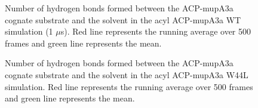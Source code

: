 \begin{singlespacing}
		\setlength\fboxsep{5pt}
		\setlength\fboxrule{1.5pt}
		\begin{figure}[htbp]
		\centering
		\caption[Number of hydrogen bonds formed between the ACP-mupA3a cognate substrate and the solvent in the acyl ACP-mupA3a WT simulation (1 $ \mu $s).]{Number of hydrogen bonds formed between the ACP-mupA3a cognate substrate and the solvent in the acyl ACP-mupA3a WT simulation (1 $ \mu $s).  Red line represents the running average over 500 frames and green line represents the mean.}
		\label{fig:HbondACPSPMWild1000_solvent}
		\end{figure}			
		
		\setlength\fboxsep{5pt}
		\setlength\fboxrule{1.5pt}
		\begin{figure}[htbp]
		\centering
		\caption[Number of hydrogen bonds formed between the ACP-mupA3a cognate substrate and the solvent in the acyl ACP-mupA3a W44L simulation.]{Number of hydrogen bonds formed between the ACP-mupA3a cognate substrate and the solvent in the acyl ACP-mupA3a W44L simulation.  Red line represents the running average over 500 frames and green line represents the mean.}
		\label{fig:HbondACPSPMMutant_solvent}
		\end{figure}	


\end{singlespacing}
